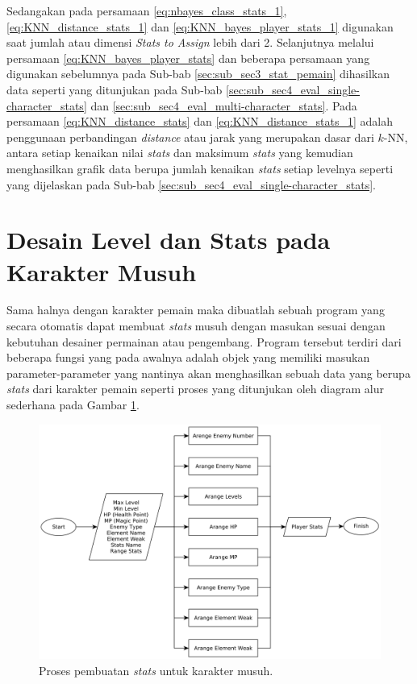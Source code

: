 Sedangakan pada persamaan \ref{eq:nbayes_class_stats_1}, \ref{eq:KNN_distance_stats_1} dan \ref{eq:KNN_bayes_player_stats_1} digunakan saat jumlah atau dimensi \textit{Stats to Assign} lebih dari 2. Selanjutnya melalui persamaan \ref{eq:KNN_bayes_player_stats} dan beberapa persamaan yang digunakan sebelumnya pada Sub-bab \ref{sec:sub_sec3_stat_pemain} dihasilkan data seperti yang ditunjukan pada Sub-bab \ref{sec:sub_sec4_eval_single-character_stats} dan \ref{sec:sub_sec4_eval_multi-character_stats}. Pada persamaan \ref{eq:KNN_distance_stats} dan \ref{eq:KNN_distance_stats_1} adalah penggunaan perbandingan \textit{distance} atau jarak yang merupakan dasar dari $k$-NN, antara setiap kenaikan nilai \textit{stats} dan maksimum \textit{stats} yang kemudian menghasilkan grafik data berupa jumlah kenaikan \textit{stats} setiap levelnya seperti yang dijelaskan pada Sub-bab \ref{sec:sub_sec4_eval_single-character_stats}.
\vspace{1ex}

\section{Desain Level dan Stats pada Karakter Musuh}
\label{sec:sec3_enemy_stats}
\vspace{1ex}

Sama halnya dengan karakter pemain maka dibuatlah sebuah program yang secara otomatis dapat membuat \textit{stats} musuh dengan masukan sesuai dengan kebutuhan desainer permainan atau pengembang. Program tersebut terdiri dari beberapa fungsi yang pada awalnya adalah objek yang memiliki masukan parameter-parameter yang nantinya akan menghasilkan sebuah data yang berupa \textit{stats} dari karakter pemain seperti proses yang ditunjukan oleh diagram alur sederhana pada Gambar \ref{fig:enemy_stats_generator}.
\vspace{1ex}

\begin{figure} [!h] \centering
	\includegraphics[scale=0.087]{img/enemy_stats_generator.png}
	\caption{Proses pembuatan \textit{stats} untuk karakter musuh.}
	\label{fig:enemy_stats_generator}
\end{figure}


